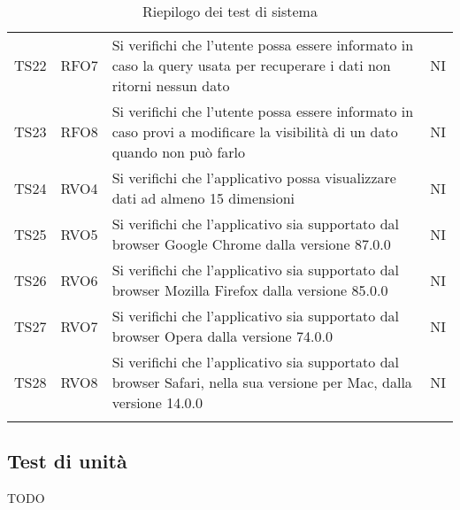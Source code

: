 \documentclass[../piano_di_qualifica.tex]{subfiles}
\begin{document}
\begin{center}
\begin{longtable}{|c|c|p{8cm}|c|}
		TS22              & RFO7                   & Si verifichi che l'utente possa essere informato in caso la query usata per recuperare i dati non ritorni nessun dato     & NI                         \\
		TS23              & RFO8                   & Si verifichi che l'utente possa essere informato in caso provi a modificare la visibilità di un dato quando non può farlo & NI                         \\
		TS24              & RVO4                   & Si verifichi che l'applicativo possa visualizzare dati ad almeno 15 dimensioni                                            & NI                         \\
		TS25              & RVO5                   & Si verifichi che l'applicativo sia supportato dal browser Google Chrome dalla versione 87.0.0                             & NI                         \\
		TS26              & RVO6                   & Si verifichi che l'applicativo sia supportato dal browser Mozilla Firefox dalla versione 85.0.0                           & NI                         \\
		TS27              & RVO7                   & Si verifichi che l'applicativo sia supportato dal browser Opera dalla versione 74.0.0                                     & NI                         \\
		TS28              & RVO8                   & Si verifichi che l'applicativo sia supportato dal browser Safari, nella sua versione per Mac, dalla versione 14.0.0       & NI                         \\
		\hline
		\rowcolor{white}
		\caption{Riepilogo dei test di sistema}
	\end{longtable}
\end{center}



\subsection{Test di unità}%
\label{sub:test_unit}

TODO
\end{document}
